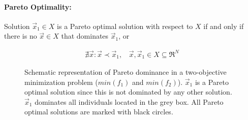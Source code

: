 \paragraph{Pareto Optimality:} Solution  $\vec{x}_1 \in X$ is a Pareto optimal solution with respect to $X$ if and only if there is no $\vec{x} \in X$ that dominates $\vec{x}_1$, or 


\begin{eqnarray}
    \nexists\vec{x}:\vec{x}\prec\vec{x}_1, ~~~~ \vec{x},\vec{x}_1\in X \!\subseteq\! \Re^{N}
\end{eqnarray}
 

\begin{figure}[h!]
\begin{minipage}[b]{1\linewidth}
 \centering
\end{minipage}
\caption{Schematic representation of Pareto dominance in a two-objective minimization problem ($min(f_1)$ and $min(f_2)$). $\vec{x}_1$ is a Pareto optimal solution since this is not dominated by any other solution. $\vec{x}_1$ dominates all individuals located in the grey box. All Pareto optimal solutions are marked with black circles.} 
\label{Pareto2}
\end{figure}



